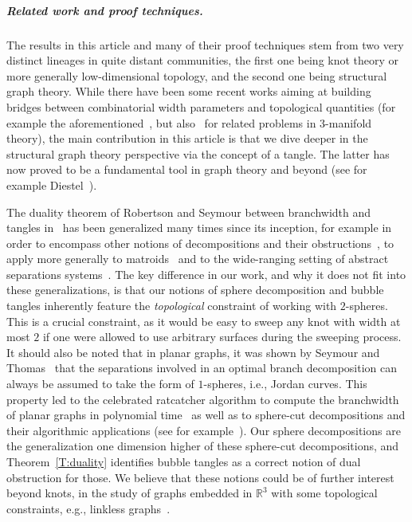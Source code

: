 \documentclass[11pt,a4paper]{article}
\begin{document}
\subparagraph*{Related work and proof techniques.} The results in this article and many of their proof techniques stem from two very distinct lineages in quite distant communities, the first one being knot theory or more generally low-dimensional topology, and the second one being structural graph theory. While there have been some recent works aiming at building bridges between combinatorial width parameters and topological quantities (for example the aforementioned~\cite{Mesmay_treewidth}, but also~\cite{huszar2,huszar1,mariapurcell} for related problems in $3$-manifold theory), the main contribution in this article is that we dive deeper in the structural graph theory perspective via the concept of a tangle. The latter has now proved to be a fundamental tool in graph theory and beyond (see for example Diestel~\cite[Preface to the 5th edition]{Diestel_Graph_Theory}).


The duality theorem of Robertson and Seymour between branchwidth and tangles in~\cite{Graph_Minors_X} has been generalized many times since its inception, for example in order to encompass other notions of decompositions and their obstructions~\cite{amini,lyaudet}, to apply more generally to matroids~\cite{Geelen_Matroid} and to the wide-ranging setting of abstract separations systems~\cite{Diestel_Tangle,diestelACS}. The key difference in our work, and why it does not fit into these generalizations, is that our notions of sphere decomposition and bubble tangles inherently feature the \emph{topological} constraint of working with $2$-spheres. This is a crucial constraint, as it would be easy to sweep any knot with width at most $2$ if one were allowed to use arbitrary surfaces during the sweeping process. It should also be noted that in planar graphs, it was shown by Seymour and Thomas~\cite{Seymour_Ratcatcher} that the separations involved in an optimal branch decomposition can always be assumed to take the form of $1$-spheres, i.e., Jordan curves. This property led to the celebrated ratcatcher algorithm to compute the branchwidth of planar graphs in polynomial time~\cite{Seymour_Ratcatcher} as well as to sphere-cut decompositions and their algorithmic applications (see for example~\cite{dorn2005efficient}). Our sphere decompositions are the generalization one dimension higher of these sphere-cut decompositions, and Theorem~\ref{T:duality} identifies bubble tangles as a correct notion of dual obstruction for those. We believe that these notions could be of further interest beyond knots, in the study of graphs embedded in $\mathbb{R}^3$ with some topological constraints, e.g., linkless graphs~\cite{sachs}.
\end{document}
